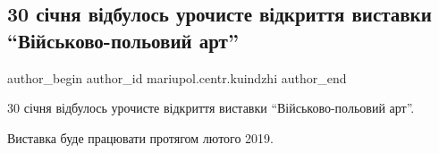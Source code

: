  
 
 
 
 

\subsection{30 січня відбулось урочисте відкриття виставки \enquote{Військово-польовий арт}}
\label{sec:30_01_2019.fb.mariupol.centr.kuindzhi.1.vidkryttja_vystavka_vijskovo_poljovyj_art}

\ifcmt
 author_begin
   author_id mariupol.centr.kuindzhi
 author_end
\fi

30 січня відбулось урочисте відкриття виставки \enquote{Військово-польовий арт}.

Виставка буде працювати протягом лютого 2019.
